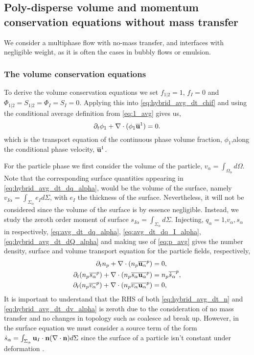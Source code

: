 \subsection{Poly-disperse volume and momentum conservation equations without mass transfer}

We consider a multiphase flow with no-mass transfer, and interfaces with negligible weight, as it is often the cases in bubbly flows or emulsion. 


\subsubsection*{The volume conservation equations}

To derive the volume conservation equations we set $f_{1|2} = 1$, $f_I = 0$ and  $\Phi_{1|2} = S_{1|2} =\Phi_{I} = S_{I} = 0$. 
Applying this into \ref{eq:hybrid_avg_dt_chif} and using the conditional average definition from \ref{eq:1_avg} gives us,
\begin{equation}
    \partial_t \phi_1
    + \mathbf{\nabla} \cdot (\phi_1 \overline{\textbf{u}}^1)
    = 0.
    \label{eq:hybrid_avg_dt_chi}
\end{equation}
which is the transport equation of the continuous phase volume fraction, $\phi_1$,along the conditional phase velocity, $\overline{\textbf{u}}^1$. 

For the particle phase we first consider the volume of the particle, $v_\alpha = \int_{\Omega_\alpha} d\Omega$.
Note that the corresponding surface quantities appearing in \ref{eq:hybrid_avg_dt_dq_alpha}, would be the volume of the surface, namely $v_{I\alpha} = \int_{\Sigma_\alpha} e_I d\Sigma$, with $e_I$ the thickness of the surface. 
Nevertheless, it will not be considered since the volume of the surface is by essence negligible.
Instead,  we study the zeroth order moment of surface $s_{I\alpha} = \int_{\Sigma_\alpha} d\Sigma$. 
Injecting, $q_\alpha = 1$,$v_\alpha, s_\alpha$ in respectively, \ref{eq:avg_dt_dq_alpha}, \ref{eq:avg_dt_dq_I_alpha}, \ref{eq:hybrid_avg_dt_dQ_alpha} and making use of \ref{eq:p_avg} gives the number density, surface and volume transport equation for the particle fields, respectively,
\begin{align}
    \partial_t n_p
    + \mathbf{\nabla} \cdot (n_p\overline{\textbf{u}_\alpha}^{p})
    &= 
    0,
    \label{eq:hybrid_avg_dt_n}\\
    \partial_t (n_p\overline{s_\alpha}^{p})
    + \mathbf{\nabla} \cdot (n_p\overline{s_\alpha\textbf{u}_\alpha}^{p})
    &= n_p\overline{\dot{s}_\alpha}^{p},
    \label{eq:hybrid_avg_dt_ds_alpha}\\
    \partial_t (n_p\overline{v_\alpha}^{p})
    + \mathbf{\nabla} \cdot (n_p\overline{v_\alpha\textbf{u}_\alpha}^{p})
    &= 0,
    \label{eq:hybrid_avg_dt_dv_alpha}
\end{align}
It is important to understand that the RHS of both \ref{eq:hybrid_avg_dt_n} and \ref{eq:hybrid_avg_dt_dv_alpha} is zeroth due to the consideration of no mass transfer and no changes in topology such as coalesce ad break up.
However, in the surface equation we must consider a source term of the form $\dot{s}_\alpha = \int_{\Sigma_\alpha} \textbf{u}_I \cdot \textbf{n}(\mathbf{\nabla} \cdot \textbf{n}) d\Sigma$ since the surface of a particle isn't constant under deformation \citep{morel2007surface}. 

